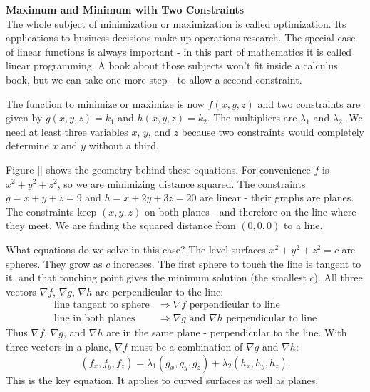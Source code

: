 \noindent\textbf{\large Maximum and Minimum with Two Constraints}\\

The whole subject of minimization or maximization is called optimization. Its applications to business decisions make up operations research. The special case of linear functions is always important - in this part of mathematics it is called linear programming. A book about those subjects won't fit inside a calculus book, but we can take one more step - to allow a second constraint.

The function to minimize or maximize is now $f(x,y,z)$ and two constraints are given by $g(x,y,z) = k_1$ and $h(x,y,z) = k_2$.  The multipliers are $\lambda_1$ and $\lambda_2$.  We need at least three variables $x$, $y$, and $z$ because two constraints would completely determine $x$ and $y$ without a third.

Figure \ref{} shows the geometry behind these equations.  For convenience $f$ is $x^2 + y^2 + z^2$, so we are minimizing distance squared.  The constraints $g = x + y + z = 9$ and $h = x + 2y + 3z = 20$ are linear - their graphs are planes.  The constraints keep $(x,y,z)$ on both planes - and therefore on the line where they meet.  We are finding the squared distance from $(0,0,0)$ to a line.  

What equations do we solve in this case?  The level surfaces $x^2 + y^2 + z^2 = c$ are spheres.  They grow as $c$ increases.  The first sphere to touch the line is tangent to it, and that touching point gives the minimum solution (the smallest $c$). All three vectors $\nabla f$, $\nabla g$, $\nabla h$ are perpendicular to the line:
\begin{align*}
\text{line tangent to sphere} & \Rightarrow \nabla f \text{ perpendicular to line} \\
\text{line in both planes} & \Rightarrow \nabla g \text{ and } \nabla h \text{ perpendicular to line}
\end{align*}
Thus $\nabla f$, $\nabla g$, and $\nabla h$ are in the same plane - perpendicular to the line.  With three vectors in a plane, $\nabla f$ must be a combination of $\nabla g$ and $\nabla h$:
$$(f_x,f_y,f_z) = \lambda_1 (g_x,g_y,g_z) + \lambda_2 (h_x,h_y,h_z).$$
This is the key equation.  It applies to curved surfaces as well as planes.

